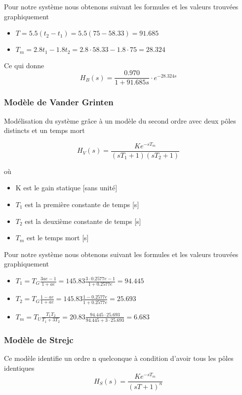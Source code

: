 Pour notre système nous obtenons suivant les formules et les valeurs trouvées graphiquement 
\begin{itemize}
\item $T = 5.5 (t_{2} - t_{1}) = 5.5 (75 - 58.33) = 91.685$
\item $T_{m} = 2.8 t_{1} - 1.8 t_{2} = 2.8 \cdot 58.33 - 1.8 \cdot 75 = 28.324$
\end{itemize}

Ce qui donne 
\begin{equation}
H_{B}(s) = \frac{0.970}{1 + 91.685s } \cdot e^{-28.324s}
\end{equation}

\subsubsection{Modèle de Vander Grinten}
Modélisation du système grâce à un modèle du second ordre avec deux pôles distincts et un temps mort

\begin{equation}
H_{V}(s) = \frac{K e^{-s T_{m}}}{(sT_{1} + 1) (sT_{2} + 1)}
\end{equation}

où 
\begin{itemize}
\item K est le gain statique [sans unité]
\item $T_{1}$ est la première constante de temps [s]
\item $T_{2}$ est la deuxième constante de temps [s]
\item $T_{m}$ est le temps mort [s]
\end{itemize}

Pour notre système nous obtenons suivant les formules et les valeurs trouvées graphiquement 
\begin{itemize}
\item $T_{1} = T_{G} \frac{3ae - 1}{1 + ae} = 145.83 \frac{3 \cdot 0.2577e - 1}{1 + 0.2577e} = 94.445$
\item $T_{2} = T_{G} \frac{1 - ae}{1 + ae} = 145.83 \frac{1 - 0.2577e}{1 + 0.2577e} = 25.693$
\item $T_{m} = T_{U} \frac{T_{1}T_{2}}{T_{1} + 3T_{2}} = 20.83 \frac{94.445 \cdot 25.693}{94.445 + 3 \cdot 25.693} = 6.683$
\end{itemize}

\subsubsection{Modèle de Strejc}
Ce modèle identifie un ordre n quelconque à condition d'avoir tous les pôles identiques
\begin{equation}
H_{S}(s) = \frac{K e^{-s T_{m}}}{(sT + 1)^{n}}
\end{equation}

